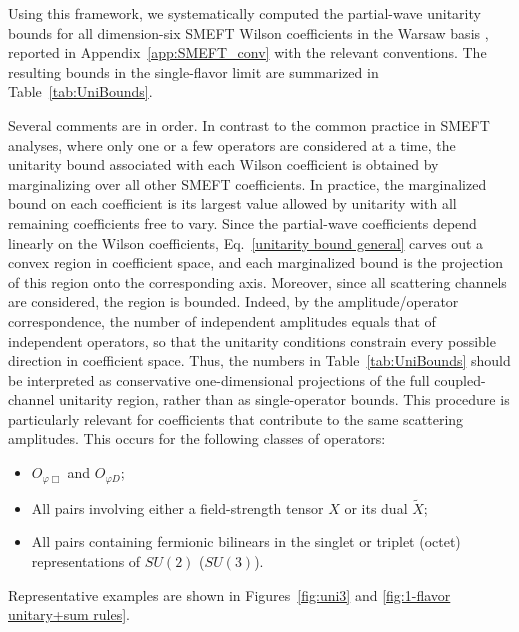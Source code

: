 Using this framework, we systematically computed the partial-wave unitarity bounds 
for all dimension-six SMEFT Wilson coefficients in the Warsaw basis \cite{Grzadkowski:2010es}, reported in Appendix~\ref{app:SMEFT_conv} with the relevant conventions. 
The resulting bounds in the single-flavor limit are summarized in Table~\ref{tab:UniBounds}.



Several comments are in order. 
In contrast to the common practice in SMEFT analyses, where only one or a few operators are considered at a time, the unitarity bound associated with each Wilson coefficient is obtained by marginalizing over all other SMEFT coefficients. 
In practice, the marginalized bound on each coefficient is its largest value allowed by unitarity with all remaining coefficients free to vary. Since the partial-wave coefficients depend linearly on the Wilson coefficients,
Eq.~\eqref{unitarity bound general} carves out a convex region in coefficient space,
and each marginalized bound is the projection of this region onto the corresponding
axis. Moreover, since all scattering channels are considered, the region is bounded. Indeed, by the amplitude/operator correspondence, the number of independent amplitudes equals that of independent operators, so that the unitarity conditions constrain every possible direction in coefficient space. Thus, the numbers in Table~\ref{tab:UniBounds} should be interpreted as conservative one-dimensional projections of the full coupled-channel unitarity region, rather than as single-operator bounds.
This procedure is particularly relevant for coefficients that contribute to the same scattering amplitudes. This occurs for the following classes of operators:
\begin{itemize}
    \item $O_{\varphi \Box}$ and $O_{\varphi D}$;
    \item All pairs involving either a field-strength tensor $X$ or its dual $\widetilde X$;
    \item All pairs containing fermionic bilinears in the singlet or triplet (octet) representations of $SU(2)$ ($SU(3)$).
\end{itemize}
Representative examples are shown in Figures~\ref{fig:uni3} and \ref{fig:1-flavor unitary+sum rules}.

